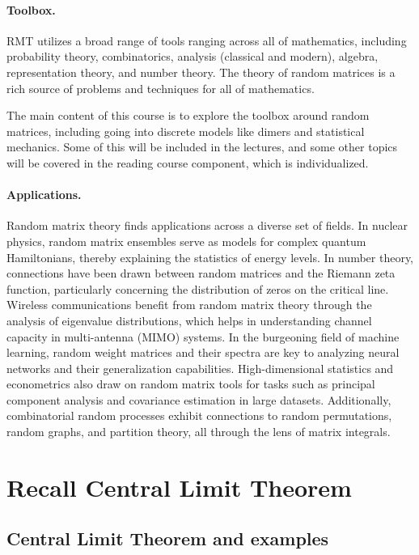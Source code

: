 \documentclass[letterpaper,11pt,oneside,reqno]{article}
\numberwithin{equation}{section}
\theoremstyle{definition}
\begin{document}
\paragraph{Toolbox.}
RMT utilizes a broad range of tools ranging across all of mathematics, including probability theory, combinatorics, analysis (classical and modern), algebra, representation theory, and number theory.
The theory of random matrices is a rich source of problems and techniques for all of mathematics.

The main content of this course is to explore the toolbox
around random matrices, including going into discrete models
like dimers and statistical mechanics. Some of this will be included
in the lectures, and some other topics will be covered in the
reading course component, which is individualized.

\paragraph{Applications.}
Random matrix theory finds applications across a diverse set
of fields. In nuclear physics, random matrix ensembles serve
as models for complex quantum Hamiltonians, thereby
explaining the statistics of energy levels. In number
theory, connections have been drawn between random matrices
and the Riemann zeta function, particularly concerning the
distribution of zeros on the critical line. Wireless
communications benefit from random matrix theory through the
analysis of eigenvalue distributions, which helps in
understanding channel capacity in multi-antenna (MIMO) systems. In the burgeoning field of
machine learning, random weight matrices and their spectra
are key to analyzing neural networks and their
generalization capabilities. High-dimensional statistics
and econometrics
also draw on random matrix tools for tasks such as principal
component analysis and covariance estimation in large
datasets. Additionally, combinatorial random processes
exhibit connections to random permutations, random graphs,
and partition theory, all through the lens of matrix
integrals.

\section{Recall Central Limit Theorem}

\subsection{Central Limit Theorem and examples}
\end{document}
